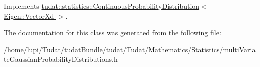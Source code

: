 Implements \hyperlink{classtudat_1_1statistics_1_1ContinuousProbabilityDistribution_a7edfe6753ce63fe4e12409d3fb88e499}{tudat\+::statistics\+::\+Continuous\+Probability\+Distribution$<$ Eigen\+::\+Vector\+Xd $>$}.



The documentation for this class was generated from the following file\+:\begin{DoxyCompactItemize}
\item 
/home/lupi/\+Tudat/tudat\+Bundle/tudat/\+Tudat/\+Mathematics/\+Statistics/multi\+Variate\+Gaussian\+Probability\+Distributions.\+h\end{DoxyCompactItemize}
